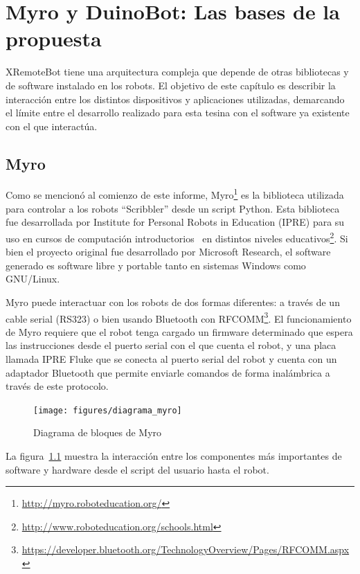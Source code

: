 \chapter{Myro y DuinoBot: Las bases de la propuesta}\label{cha:myro_y_duinobot}


XRemoteBot tiene una arquitectura compleja que
depende de otras bibliotecas y de software instalado en los robots.
El objetivo de este capítulo es describir la interacción entre los
distintos dispositivos y aplicaciones utilizadas, demarcando el límite
entre el desarrollo realizado para esta tesina con el software ya
existente con el que interactúa.

\section{Myro}\label{sec:myro}

Como se mencionó al comienzo de este informe,
Myro\footnote{\url{http://myro.roboteducation.org/}}
es la biblioteca utilizada para controlar a los robots
``Scribbler''
desde un script Python. Esta biblioteca fue desarrollada por
Institute for Personal Robots in Education (IPRE)
para su uso en cursos de computación introductorios~\citep{kumar_2009}
en distintos niveles
educativos\footnote{\url{http://www.roboteducation.org/schools.html}}.
Si bien el proyecto original fue desarrollado por Microsoft Research,
el software generado es software libre y portable tanto en sistemas Windows
como GNU/Linux.

Myro puede interactuar con los robots de dos
formas diferentes: a través de un cable serial (RS323) o bien usando Bluetooth
con RFCOMM\footnote{\url{https://developer.bluetooth.org/TechnologyOverview/Pages/RFCOMM.aspx}}.
El funcionamiento de Myro requiere que el robot tenga
cargado un firmware determinado que espera las instrucciones desde el puerto
serial con el que cuenta el robot, y una placa llamada IPRE Fluke que se conecta
al puerto serial del robot y cuenta con un adaptador Bluetooth que permite
enviarle comandos de forma inalámbrica a través de este protocolo.

\begin{figure}
    \centering
    \texttt{[image: figures/diagrama\_myro]}
    \caption{Diagrama de bloques de Myro}\label{fig:diagrama_myro}
\end{figure}

La figura~\ref{fig:diagrama_myro} muestra la interacción entre los componentes
más importantes de software y hardware desde el script del usuario hasta el
robot.

